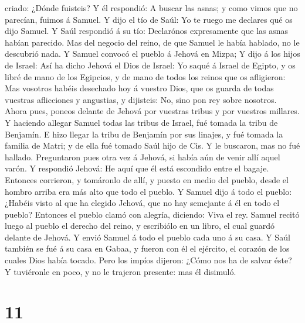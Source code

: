 criado: ¿Dónde fuisteis? Y él respondió: A buscar las asnas; y como
vimos que no parecían, fuimos á Samuel.  Y dijo el tío de
Saúl: Yo te ruego me declares qué os dijo Samuel.  Y Saúl
respondió á su tío: Declarónos expresamente que las asnas habían
parecido. Mas del negocio del reino, de que Samuel le había hablado, no
le descubrió nada.  Y Samuel convocó el pueblo á Jehová
en Mizpa;  Y dijo á los hijos de Israel: Así ha dicho
Jehová el Dios de Israel: Yo saqué á Israel de Egipto, y os libré de
mano de los Egipcios, y de mano de todos los reinos que os afligieron:
 Mas vosotros habéis desechado hoy á vuestro Dios, que os
guarda de todas vuestras aflicciones y angustias, y dijisteis: No, sino
pon rey sobre nosotros. Ahora pues, poneos delante de Jehová por
vuestras tribus y por vuestros millares.  Y haciendo
allegar Samuel todas las tribus de Israel, fué tomada la tribu de
Benjamín.  E hizo llegar la tribu de Benjamín por sus
linajes, y fué tomada la familia de Matri; y de ella fué tomado Saúl
hijo de Cis. Y le buscaron, mas no fué hallado. 
Preguntaron pues otra vez á Jehová, si había aún de venir allí aquel
varón. Y respondió Jehová: He aquí que él está escondido entre el
bagaje.  Entonces corrieron, y tomáronlo de allí, y
puesto en medio del pueblo, desde el hombro arriba era más alto que todo
el pueblo.  Y Samuel dijo á todo el pueblo: ¿Habéis visto
al que ha elegido Jehová, que no hay semejante á él en todo el pueblo?
Entonces el pueblo clamó con alegría, diciendo: Viva el rey.
 Samuel recitó luego al pueblo el derecho del reino, y
escribiólo en un libro, el cual guardó delante de Jehová.
 Y envió Samuel á todo el pueblo cada uno á su casa. Y
Saúl también se fué á su casa en Gabaa, y fueron con él el ejército, el
corazón de los cuales Dios había tocado.  Pero los impíos
dijeron: ¿Cómo nos ha de salvar éste? Y tuviéronle en poco, y no le
trajeron presente: mas él disimuló.

\hypertarget{section-10}{%
\section{11}\label{section-10}}


